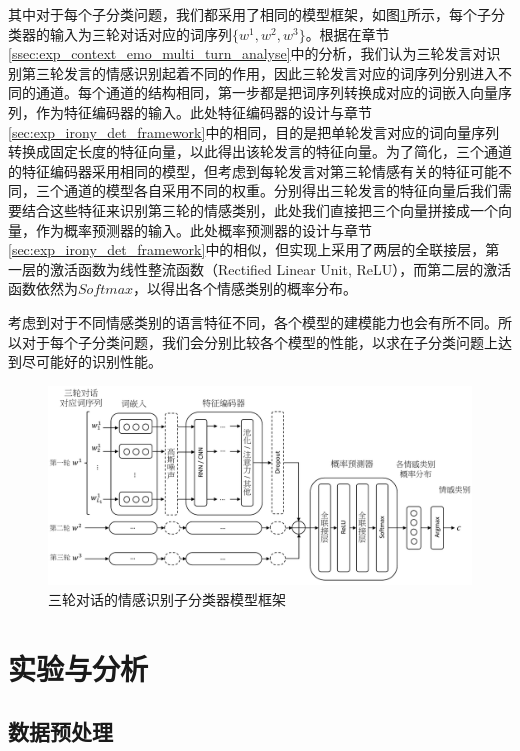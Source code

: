 其中对于每个子分类问题，我们都采用了相同的模型框架，如图\ref{fig:context_emo_cls_framework}所示，每个子分类器的输入为三轮对话对应的词序列$\{w^1, w^2, w^3\}$。根据在章节\ref{ssec:exp_context_emo_multi_turn_analyse}中的分析，我们认为三轮发言对识别第三轮发言的情感识别起着不同的作用，因此三轮发言对应的词序列分别进入不同的通道。每个通道的结构相同，第一步都是把词序列转换成对应的词嵌入向量序列，作为特征编码器的输入。此处特征编码器的设计与章节\ref{sec:exp_irony_det_framework}中的相同，目的是把单轮发言对应的词向量序列转换成固定长度的特征向量，以此得出该轮发言的特征向量。为了简化，三个通道的特征编码器采用相同的模型，但考虑到每轮发言对第三轮情感有关的特征可能不同，三个通道的模型各自采用不同的权重。分别得出三轮发言的特征向量后我们需要结合这些特征来识别第三轮的情感类别，此处我们直接把三个向量拼接成一个向量，作为概率预测器的输入。此处概率预测器的设计与章节\ref{sec:exp_irony_det_framework}中的相似，但实现上采用了两层的全联接层，第一层的激活函数为线性整流函数（Rectified Linear Unit, ReLU），而第二层的激活函数依然为$Softmax$，以得出各个情感类别的概率分布。

考虑到对于不同情感类别的语言特征不同，各个模型的建模能力也会有所不同。所以对于每个子分类问题，我们会分别比较各个模型的性能，以求在子分类问题上达到尽可能好的识别性能。

\begin{figure}[H]
  \centering
  \includegraphics[width=\textwidth]{img/context_emo_cls_framework.pdf}
  \caption{三轮对话的情感识别子分类器模型框架}
  \label{fig:context_emo_cls_framework}
\end{figure}

\section{实验与分析}
\label{sec:exp_context_emo_exp}

\subsection{数据预处理}

